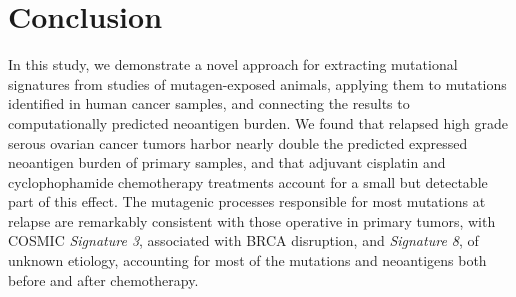 \section*{Conclusion}
In this study, we demonstrate a novel approach for extracting mutational signatures from studies of mutagen-exposed animals, applying them to mutations identified in human cancer samples, and connecting the results to computationally predicted neoantigen burden. We found that relapsed high grade serous ovarian cancer tumors harbor nearly double the predicted expressed neoantigen burden of primary samples, and that adjuvant cisplatin and cyclophophamide chemotherapy treatments account for a small but detectable part of this effect. The mutagenic processes responsible for most mutations at relapse are remarkably consistent with those operative in primary tumors, with COSMIC \textit{Signature 3}, associated with BRCA disruption, and \textit{Signature 8}, of unknown etiology, accounting for most of the mutations and neoantigens both before and after chemotherapy.